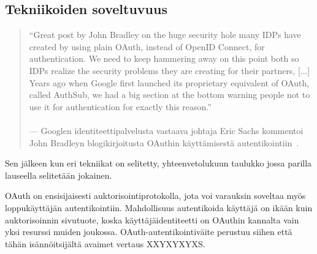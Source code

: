 \documentclass[finnish,gradu]{tktltiki}
\begin{document}




  \subsection{Tekniikoiden soveltuvuus} %
  \label{sub:tekniikoiden_yhtäläisyydet}

  \begin{quote}
    ``Great post by John Bradley on the huge security hole many IDPs have created by using plain OAuth, instead of OpenID Connect, for authentication. We need to keep hammering away on this point both so IDPs realize the security problems they are creating for their partners, [...] Years ago when Google first launched its proprietary equivalent of OAuth, called AuthSub, we had a big section at the bottom warning people not to use it for authentication for exactly this reason.''
    \\
    \\--- Googlen identiteettipalvelusta vastaava johtaja Eric Sachs
     kommentoi~\cite{sachs_comment_on_oauth_authentication_2012}
     John Bradleyn blogikirjoitusta OAuthin käyttämisestä
     autentikointiin~\cite{bradley_oauth_authentication_problem_2012}.
  \end{quote}

  Sen jälkeen kun eri tekniikat on selitetty, yhteenvetolukuun taulukko jossa parilla lauseella selitetään jokainen.

  OAuth on ensisijaisesti auktorisointiprotokolla, jota voi varauksin soveltaa myös loppukäyttäjän autentikointiin. Mahdollisuus autentikoida käyttäjä on ikään kuin auktorisoinnin sivutuote, koska käyttäjäidentiteetti on OAuthin kannalta vain yksi resurssi muiden joukossa. OAuth-autentikointiväite perustuu siihen että tähän isännöitsijältä avaimet vertaus XXYXYXYXS.
\end{document}
